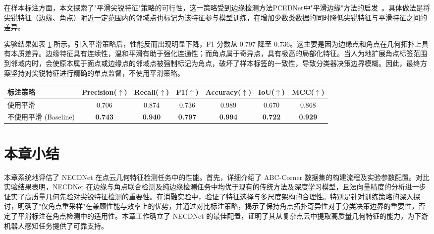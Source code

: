 在样本标注方面，本文探索了"平滑尖锐特征"策略的可行性，这一策略受到边缘检测方法PCEDNet中"平滑边缘"方法的启发~\cite{himeur_pcednet_2022}。具体做法是将尖锐特征（边缘、角点）附近一定范围内的邻域点也标记为该特征参与模型训练，在增加少数类数据的同时降低尖锐特征与平滑特征之间的差异。

实验结果如表 \ref{tab:smoothing_strategy} 所示。引入平滑策略后，性能反而出现明显下降，F1 分数从 0.797 降至 0.736。这主要是因为边缘点和角点在几何拓扑上具有本质差异。边缘特征具有连续性，温和平滑有助于强化连通性；而角点属于奇异点，具有极高的局部化特征。当人为地扩展角点标签范围到邻域内时，会使原本属于面点或边缘点的邻域点被强制标记为角点，破坏了样本标签的一致性，导致分类器决策边界模糊。因此，最终方案坚持对尖锐特征进行精确的单点监督，不使用平滑策略。

\begin{table}[ht]
    \centering
    \small
    \setlength{\tabcolsep}{6.5pt}
    \label{tab:smoothing_strategy}
    \begin{tabular}{lcccccc}
            \toprule
            标注策略 & Precision($\uparrow$) & Recall($\uparrow$) & F1($\uparrow$)& Accuracy($\uparrow$)& IoU($\uparrow$)& MCC($\uparrow$)\\
            \midrule
            使用平滑 & 0.706& 0.874& 0.736& 0.989& 0.670& 0.868\\
            不使用平滑 (Baseline) & \textbf{0.743}& \textbf{0.940}& \textbf{0.797}& \textbf{0.994}& \textbf{0.722}& \textbf{0.929}\\
            \bottomrule
        \end{tabular}
\end{table}

\section{本章小结}

本章系统地评估了 NECDNet 在点云几何特征检测任务中的性能。首先，详细介绍了 ABC-Corner 数据集的构建流程及实验参数配置。对比实验结果表明，NECDNet 在边缘与角点联合检测及纯边缘检测任务中均优于现有的传统方法及深度学习模型，且法向量精度的分析进一步证实了高质量几何先验对尖锐特征检测的重要性。在消融实验中，验证了特征选择与多尺度架构的合理性。特别是针对训练策略的深入探讨，明确了"仅角点重采样"在兼顾性能与效率上的优势，并通过对比标注策略，揭示了保持角点拓扑奇异性对于分类决策边界的重要性，否定了平滑标注在角点检测中的适用性。本章工作确立了 NECDNet 的最佳配置，证明了其从复杂点云中提取高质量几何特征的能力，为下游机器人感知任务提供了可靠支持。

